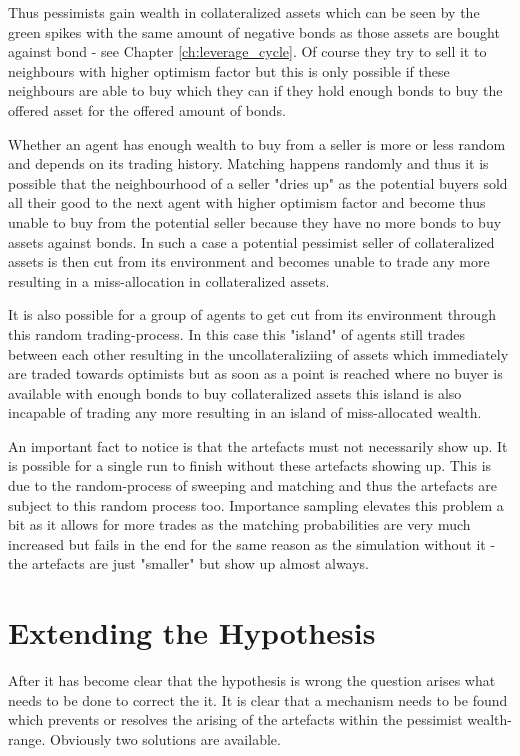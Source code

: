 \documentclass[Bachelorarbeit.tex]{subfiles}
\begin{document}
\medskip 

Thus pessimists gain wealth in collateralized assets which can be seen by the green spikes with the same amount of negative bonds as those assets are bought against bond - see Chapter \ref{ch:leverage_cycle}. Of course they try to sell it to neighbours with higher optimism factor but this is only possible if these neighbours are able to buy which they can if they hold enough bonds to buy the offered asset for the offered amount of bonds.

\medskip 

Whether an agent has enough wealth to buy from a seller is more or less random and depends on its trading history. Matching happens randomly and thus it is possible that the neighbourhood of a seller "dries up" as the potential buyers sold all their good to the next agent with higher optimism factor and become thus unable to buy from the potential seller because they have no more bonds to buy assets against bonds. In such a case a potential pessimist seller of collateralized assets is then cut from its environment and becomes unable to trade any more resulting in a miss-allocation in collateralized assets.

\medskip 

It is also possible for a group of agents to get cut from its environment through this random trading-process. In this case this "island" of agents still trades between each other resulting in the uncollateraliziing of assets which immediately are traded towards optimists but as soon as a point is reached where no buyer is available with enough bonds to buy collateralized assets this island is also incapable of trading any more resulting in an island of miss-allocated wealth.

\medskip 

An important fact to notice is that the artefacts must not necessarily show up. It is possible for a single run to finish without these artefacts showing up. This is due to the random-process of sweeping and matching and thus the artefacts are subject to this random process too. Importance sampling elevates this problem a bit as it allows for more trades as the matching probabilities are very much increased but fails in the end for the same reason as the simulation without it - the artefacts are just "smaller" but show up almost always.

\section{Extending the Hypothesis}
After it has become clear that the hypothesis is wrong the question arises what needs to be done to correct the it. It is clear that a mechanism needs to be found which prevents or resolves the arising of the artefacts within the pessimist wealth-range. Obviously two solutions are available.
\end{document}
